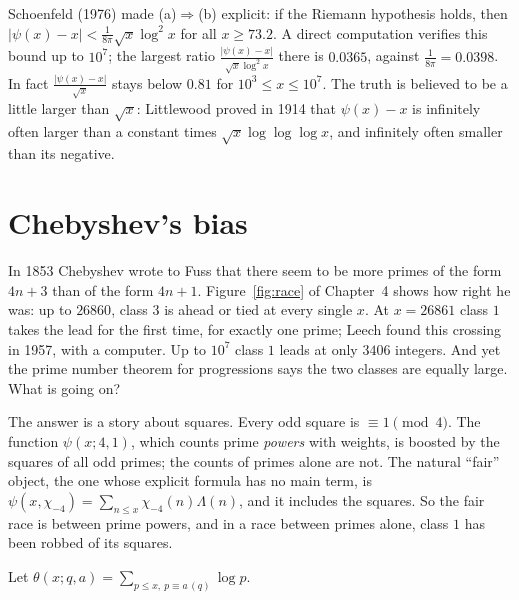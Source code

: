 \begin{remark}
Schoenfeld (1976) made (a)$\Rightarrow$(b) explicit: if the Riemann hypothesis holds, then $|\psi(x)-x|<\frac1{8\pi}\sqrt x\log^2x$ for all $x\ge73.2$. A direct computation verifies this bound up to $10^7$; the largest ratio
$\frac{|\psi(x)-x|}{\sqrt x\log^2x}$ there is $0.0365$, against $\frac1{8\pi}=0.0398$. In fact $\frac{|\psi(x)-x|}{\sqrt x}$ stays below $0.81$ for $10^3\le x\le10^7$. The truth is believed to be a little larger than
$\sqrt x$: Littlewood proved in 1914 that $\psi(x)-x$ is infinitely often larger than a constant times $\sqrt x\log\log\log x$, and infinitely often smaller than its negative.
\end{remark}

\section{Chebyshev's bias}

In 1853 Chebyshev wrote to Fuss that there seem to be more primes of the form $4n+3$ than of the form $4n+1$. Figure~\ref{fig:race} of Chapter~4 shows how right he was: up to $26860$, class $3$
is ahead or tied at every single $x$. At $x=26861$ class $1$ takes the lead for the first time, for exactly one prime; Leech found this crossing in 1957, with a computer. Up to $10^7$ class $1$ leads
at only $3406$ integers. And yet the prime number theorem for progressions says the two classes are equally large. What is going on?

The answer is a story about squares. Every odd square is $\equiv1\pmod4$. The function $\psi(x;4,1)$, which counts prime \emph{powers} with weights, is boosted by the squares of all odd primes; the
counts of primes alone are not. The natural ``fair'' object, the one whose explicit formula has no main term, is $\psi(x,\chi_{-4})=\sum_{n\le x}\chi_{-4}(n)\Lambda(n)$, and it includes the squares. So the
fair race is between prime powers, and in a race between primes alone, class $1$ has been robbed of its squares.

Let $\theta(x;q,a)=\sum_{p\le x,\ p\equiv a\,(q)}\log p$.

